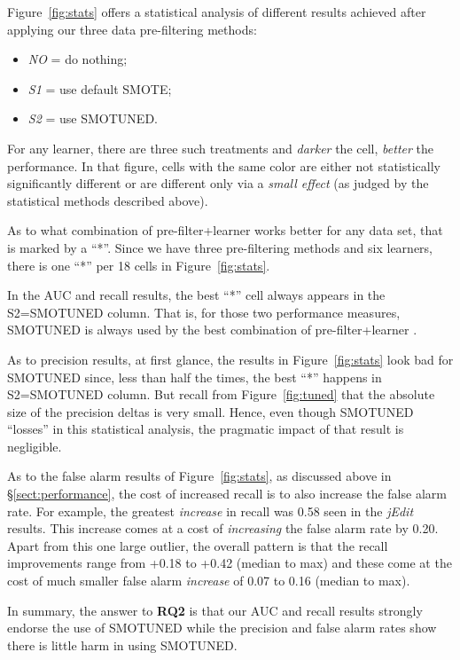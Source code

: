 \documentclass[10pt,conference]{IEEEtran}
\newcommand{\bi}{\begin{itemize}[leftmargin=0.4cm]}
\newcommand{\ei}{\end{itemize}}
\theoremstyle{break}
\theoremstyle{break}
\newcommand{\tion}[1]{{\S}\ref{sect:#1}}
\newcommand{\sma}{{\sc SMOTE}}
\newcommand{\smb}{{\sc SMOTUNED}}
\begin{document}
Figure~\ref{fig:stats} offers a statistical analysis
of different results achieved
after applying our three data pre-filtering methods:
\bi
\item  {\em NO} = do nothing;
\item {\em S1} = use default {\sma};
\item {\em S2} = use {\smb}.
\ei
For any learner, there are three such treatments and {\em darker} the cell, {\em better} the performance. 
In that figure, cells with the same color are
either not statistically significantly different or
are different only via a {\em small effect}
(as judged by the statistical methods described above).

As to what combination of pre-filter+learner works better for any data set, that is marked by a ``*''. Since we have three pre-filtering methods and six learners, there is one   ``*'' per 18 cells in Figure~\ref{fig:stats}.

In the  AUC and recall results,  the best ``*'' cell always appears in the S2={\smb} column. 
That is, for those two performance measures,  {\smb} is always
used by the best combination of pre-filter+learner .

As to precision  results,  at first glance, the  results in Figure~\ref{fig:stats} look bad for {\smb} since, less than half the times, 
the best ``*''  happens  in S2={\smb} column.
 But recall from Figure~\ref{fig:tuned} that the absolute size of the precision deltas is very small.  Hence, even though {\smb} ``losses'' in this statistical analysis, the pragmatic impact of that result  is  negligible.
 
As to the false alarm results of Figure~\ref{fig:stats}, as discussed above in \tion{performance}, the cost of increased recall is to also increase
the false alarm rate. For example, the greatest \textit{increase} in recall was 0.58 seen in the {\em jEdit} results. This increase comes at a cost
of \textit{increasing} the false alarm rate by 0.20. Apart from this one large outlier, the overall pattern is that the recall improvements range from +0.18 to +0.42 (median to max)
and these come at the cost of much smaller false alarm \textit{increase} of 0.07 to 0.16 (median to max). 
 
In summary, the answer to {\bf RQ2} is that our  AUC and recall results strongly endorse the  use of {\smb}
while the precision and false alarm rates
show there is little harm in using {\smb}.
\end{document}

